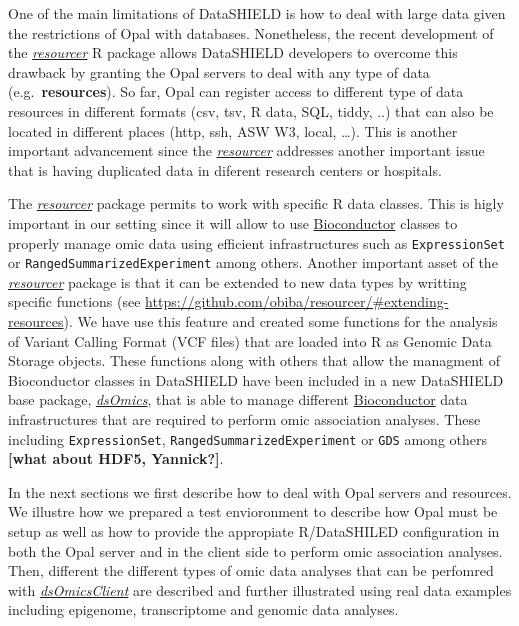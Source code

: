 \documentclass[]{article}
\begin{document}
One of the main limitations of DataSHIELD is how to deal with large data
given the restrictions of Opal with databases. Nonetheless, the recent
development of the \emph{\href{https://github.com/obiba}{resourcer}} R
package allows DataSHIELD developers to overcome this drawback by
granting the Opal servers to deal with any type of data
(e.g.~\textbf{resources}). So far, Opal can register access to different
type of data resources in different formats (csv, tsv, R data, SQL,
tiddy, ..) that can also be located in different places (http, ssh, ASW
W3, local, \ldots). This is another important advancement since the
\emph{\href{https://github.com/obiba}{resourcer}} addresses another
important issue that is having duplicated data in diferent research
centers or hospitals.

The \emph{\href{https://github.com/obiba}{resourcer}} package permits to
work with specific R data classes. This is higly important in our
setting since it will allow to use
\href{www.bioconductor.org}{Bioconductor} classes to properly manage
omic data using efficient infrastructures such as \texttt{ExpressionSet}
or \texttt{RangedSummarizedExperiment} among others. Another important
asset of the \emph{\href{https://github.com/obiba}{resourcer}} package
is that it can be extended to new data types by writting specific
functions (see
\url{https://github.com/obiba/resourcer/\#extending-resources}). We have
use this feature and created some functions for the analysis of Variant
Calling Format (VCF files) that are loaded into R as Genomic Data
Storage objects. These functions along with others that allow the
managment of Bioconductor classes in DataSHIELD have been included in a
new DataSHIELD base package,
\emph{\href{https://github.com/isglobal-brge}{dsOmics}}, that is able to
manage different \href{www.bioconductor.org}{Bioconductor} data
infrastructures that are required to perform omic association analyses.
These including \texttt{ExpressionSet},
\texttt{RangedSummarizedExperiment} or \texttt{GDS} among others
\textbf{{[}what about HDF5, Yannick?{]}}.

In the next sections we first describe how to deal with Opal servers and
resources. We illustre how we prepared a test envioronment to describe
how Opal must be setup as well as how to provide the appropiate
R/DataSHILED configuration in both the Opal server and in the client
side to perform omic association analyses. Then, different the different
types of omic data analyses that can be perfomred with
\emph{\href{https://github.com/isgloba-brge}{dsOmicsClient}} are
described and further illustrated using real data examples including
epigenome, transcriptome and genomic data analyses.
\end{document}
